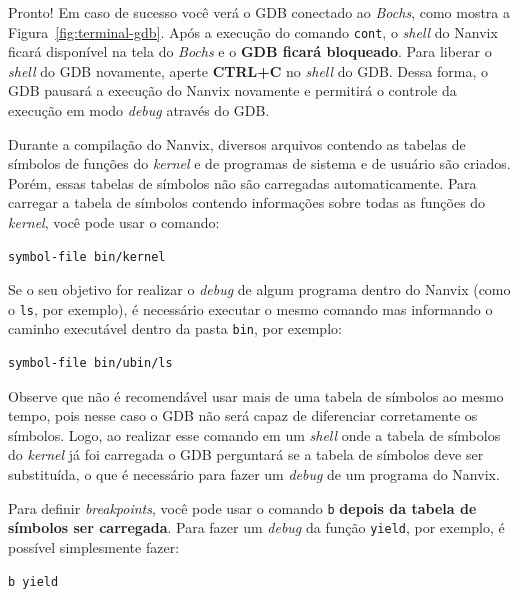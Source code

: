\documentclass[11pt]{article}
\begin{document}
Pronto! Em caso de sucesso você verá o GDB conectado ao \textit{Bochs}, como mostra a Figura~\ref{fig:terminal-gdb}. Após a execução do comando \texttt{cont}, o \textit{shell} do Nanvix ficará disponível na tela do \textit{Bochs} e o \textbf{GDB ficará bloqueado}. Para liberar o \textit{shell} do GDB novamente, aperte \textbf{CTRL+C} no \textit{shell} do GDB. Dessa forma, o GDB pausará a execução do Nanvix novamente e permitirá o controle da execução em modo \textit{debug} através do GDB.

Durante a compilação do Nanvix, diversos arquivos contendo as tabelas de símbolos de funções do \textit{kernel} e de programas de sistema e de usuário são criados. Porém, essas tabelas de símbolos não são carregadas automaticamente. Para carregar a tabela de símbolos contendo informações sobre todas as funções do \textit{kernel}, você pode usar o comando:\\

\begin{lstlisting}[language=sh,numbers=none,frame=single]
symbol-file bin/kernel
\end{lstlisting}

Se o seu objetivo for realizar o \textit{debug} de algum programa dentro do Nanvix (como o \texttt{ls}, por exemplo), é necessário executar o mesmo comando mas informando o caminho executável dentro da pasta \texttt{bin}, por exemplo:\\

\begin{lstlisting}[language=sh,numbers=none,frame=single]
symbol-file bin/ubin/ls
\end{lstlisting}

Observe que não é recomendável usar mais de uma tabela de símbolos ao mesmo tempo, pois nesse caso o GDB não será capaz de diferenciar corretamente os símbolos. Logo, ao realizar esse comando em um \textit{shell} onde a tabela de símbolos do \textit{kernel} já foi carregada o GDB perguntará se a tabela de símbolos deve ser substituída, o que é necessário para fazer um \textit{debug} de um programa do Nanvix.

Para definir \textit{breakpoints}, você pode usar o comando \texttt{b} \textbf{depois da tabela de símbolos ser carregada}. Para fazer um \textit{debug} da função \texttt{yield}, por exemplo, é possível simplesmente fazer:\\

\begin{lstlisting}[language=sh,numbers=none,frame=single]
b yield
\end{lstlisting}
\end{document}
